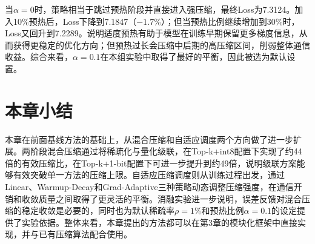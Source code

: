 当\(\alpha=0\)时，策略相当于跳过预热阶段并直接进入强压缩，最终Loss为7.3124。加入10\%预热后，Loss下降到7.1847（\(-1.7\%\)）；但当预热比例继续增加到30\%时，Loss又回升到7.2289。说明适度预热有助于模型在训练早期保留更多梯度信息，从而获得更稳定的优化方向；但预热过长会压缩中后期的高压缩区间，削弱整体通信收益。综合来看，\(\alpha=0.1\)在本组实验中取得了最好的平衡，因此被选为默认设置。

\section{本章小结}

本章在前面基线方法的基础上，从混合压缩和自适应调度两个方向做了进一步扩展。两阶段混合压缩通过将稀疏化与量化级联，在Top-k+int8配置下实现了约44倍的有效压缩比，在Top-k+1-bit配置下可进一步提升到约49倍，说明级联方案能够有效突破单一方法的压缩上限。自适应压缩调度则从训练过程出发，通过Linear、Warmup-Decay和Grad-Adaptive三种策略动态调整压缩强度，在通信开销和收敛质量之间取得了更灵活的平衡。消融实验进一步说明，误差反馈对混合压缩的稳定收敛是必要的，同时也为默认稀疏率\(\rho=1\%\)和预热比例\(\alpha=0.1\)的设定提供了实验依据。整体来看，本章提出的方法都可以在第3章的模块化框架中直接实现，并与已有压缩算法配合使用。
